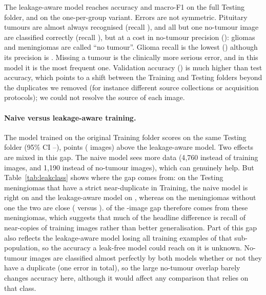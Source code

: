 \documentclass[11pt,a4paper]{article}
\begin{document}
The leakage-aware model reaches \AccCFull{} accuracy and macro-F1 \FOneCFull{} on the full Testing folder, and \AccCDedup{} on the one-per-group variant. Errors are not symmetric. Pituitary tumours are almost always recognised (recall \RecCPituitary{}), and all but one no-tumour image are classified correctly (recall \RecCNotumor{}), but at a cost in no-tumour precision (\PrecCNotumor{}): \GliToNoC{} gliomas and \MenToNoC{} meningiomas are called ``no tumour''. Glioma recall is the lowest (\RecCGlioma{}) although its precision is \PrecCGlioma{}. Missing a tumour is the clinically more serious error, and in this model it is the most frequent one. Validation accuracy (\ValAccC{}) is much higher than test accuracy, which points to a shift between the Training and Testing folders beyond the duplicates we removed (for instance different source collections or acquisition protocols); we could not resolve the source of each image.

\paragraph{Naive versus leakage-aware training.} The model trained on the original Training folder scores \AccNFull{} on the same Testing folder (95\% CI \AccLoNFull{}--\AccHiNFull{}), \DiffFull{} points (\DiffImgs{} images) above the leakage-aware model. Two effects are mixed in this gap. The naive model sees more data (4{,}760 instead of \SubTrain{} training images, and 1{,}190 instead of \TrainNotumor{} no-tumour images), which can genuinely help. But Table~\ref{tab:leakclass} shows where the gap comes from: on the \MenDupN{} Testing meningiomas that have a strict near-duplicate in Training, the naive model is right on \LBNMeningiomaDup{} and the leakage-aware model on \LBCMeningiomaDup{}, whereas on the meningiomas without one the two are close (\LBNMeningiomaNoDup{} versus \LBCMeningiomaNoDup{}). \MenGapImgs{} of the \DiffImgs{}-image gap therefore comes from these \MenDupN{} meningiomas, which suggests that much of the headline difference is recall of near-copies of training images rather than better generalisation. Part of this gap also reflects the leakage-aware model losing all training examples of that sub-population, so the accuracy a leak-free model could reach on it is unknown. No-tumour images are classified almost perfectly by both models whether or not they have a duplicate (one error in total), so the large no-tumour overlap barely changes accuracy here, although it would affect any comparison that relies on that class.
\end{document}
